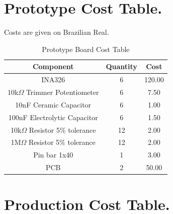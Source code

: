 \chapter{Prototype Cost Table.}

Costs are given on Brazilian Real.\\
\begin{table}[htb]
  \begin{center}
    \ABNTEXreducedfont
    \caption[Prototype Board Cost Table]{Prototype Board Cost Table}
    \label{Prototype-cost}
    \begin{tabular}{|c|c|c|}
    \hline
    Component & Quantity & Cost \\ \hline
    INA326 & 6 & 120.00\\ \hline
    10k$\Omega$ Trimmer Potentiometer & 6 & 7.50 \\ \hline
    10nF Ceramic Capacitor & 6 & 1.00 \\ \hline
    100nF Electrolytic Capacitor & 6 & 1.50 \\ \hline
    10k$\Omega$ Resistor 5$\%$ tolerance & 12 & 2.00 \\ \hline
    1M$\Omega$ Resistor 5$\%$ tolerance & 12 & 2.00 \\ \hline
    Pin bar 1x40 & 1 & 3.00 \\ \hline
    PCB & 2 & 50.00 \\ \hline
  \end{tabular}
\end{center}
\end{table}

\chapter{Production Cost Table.}

